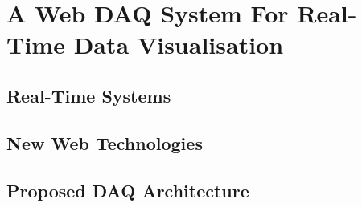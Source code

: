 \chapter{A Web DAQ System For Real-Time Data Visualisation}
\label{chap:web_daq}

    \section{Real-Time Systems}
    \section{New Web Technologies}
    \section{Proposed DAQ Architecture}
